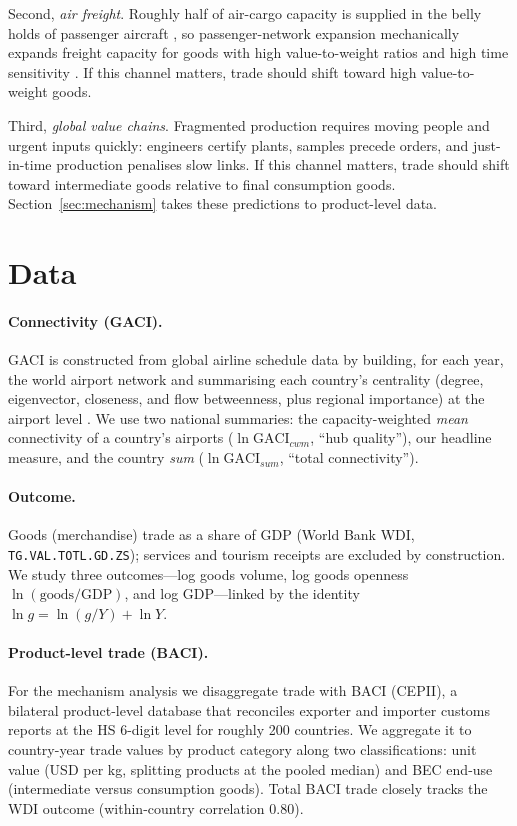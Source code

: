 Second, \emph{air freight}. Roughly half of air-cargo capacity is supplied in
the belly holds of passenger aircraft \citep{IATA_cargo}, so passenger-network
expansion mechanically expands freight capacity for goods with high
value-to-weight ratios and high time sensitivity \citep{Hummels_2013}. If this
channel matters, trade should shift toward high value-to-weight goods.

Third, \emph{global value chains}. Fragmented production requires moving
people and urgent inputs quickly: engineers certify plants, samples precede
orders, and just-in-time production penalises slow links. If this channel
matters, trade should shift toward intermediate goods relative to final
consumption goods. Section~\ref{sec:mechanism} takes these predictions to
product-level data.

\section{Data}
\label{sec:data}
\paragraph{Connectivity (GACI).} GACI is constructed from global airline
schedule data by building, for each year, the world airport network and
summarising each country's centrality (degree, eigenvector, closeness, and flow
betweenness, plus regional importance) at the airport level
\citep{Cheung_2020}. We use two national summaries: the capacity-weighted
\emph{mean} connectivity of a country's airports ($\ln\mathrm{GACI}_{cwm}$,
``hub quality''), our headline measure, and the country \emph{sum}
($\ln\mathrm{GACI}_{sum}$, ``total connectivity'').

\paragraph{Outcome.} Goods (merchandise) trade as a share of GDP (World Bank
WDI, \texttt{TG.VAL.TOTL.GD.ZS}); services and tourism receipts are excluded by
construction. We study three outcomes---log goods volume, log goods openness
$\ln(\text{goods}/\text{GDP})$, and log GDP---linked by the identity
$\ln g = \ln(g/Y) + \ln Y$.

\paragraph{Product-level trade (BACI).} For the mechanism analysis we
disaggregate trade with BACI (CEPII), a bilateral product-level database that
reconciles exporter and importer customs reports at the HS 6-digit level for
roughly 200 countries. We aggregate it to country-year trade values by product
category along two classifications: unit value (USD per kg, splitting products
at the pooled median) and BEC end-use (intermediate versus consumption goods). Total BACI trade closely
tracks the WDI outcome (within-country correlation $0.80$).

